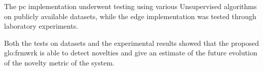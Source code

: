 The \gls{pc} implementation underwent testing using various Unsupervised algorithms on publicly available datasets, while the edge implementation was tested through laboratory experiments.

Both the tests on datasets and the experimental results showed that the proposed \gls{glo:frmwrk} is able to detect novelties and give an estimate of the future evolution of the novelty metric of the system.